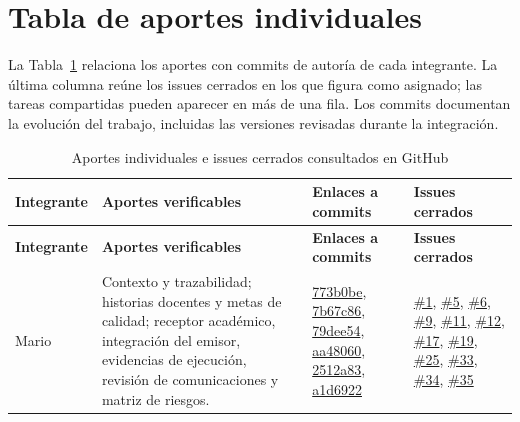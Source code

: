 \section{Tabla de aportes individuales}

La Tabla~\ref{tab:aportes-individuales} relaciona los aportes con commits de autoría de cada integrante. La última columna reúne los issues cerrados en los que figura como asignado; las tareas compartidas pueden aparecer en más de una fila. Los commits documentan la evolución del trabajo, incluidas las versiones revisadas durante la integración.

\begingroup
\small
{}
\begin{longtable}{@{}p{}>{\raggedright\arraybackslash}p{}>{\raggedright\arraybackslash}p{}>{\raggedright\arraybackslash}p{}@{}}
\caption{Aportes individuales e issues cerrados consultados en GitHub}
\label{tab:aportes-individuales}\\
\toprule
\textbf{Integrante} & \textbf{Aportes verificables} & \textbf{Enlaces a commits} & \textbf{Issues cerrados}\\
\midrule
\endfirsthead
\toprule
\textbf{Integrante} & \textbf{Aportes verificables} & \textbf{Enlaces a commits} & \textbf{Issues cerrados}\\
\midrule
\endhead
Mario & Contexto y trazabilidad; historias docentes y metas de calidad; receptor académico, integración del emisor, evidencias de ejecución, revisión de comunicaciones y matriz de riesgos. & \href{https://github.com/Yukisan-uwo/PFC-SGRA/commit/773b0be5be8f30265fbb282b1c5fd1ef332f890a}{773b0be}, \newline \href{https://github.com/Yukisan-uwo/PFC-SGRA/commit/7b67c8678546ac0ca935ab6de85fb188c0a5b31d}{7b67c86}, \newline \href{https://github.com/Yukisan-uwo/PFC-SGRA/commit/79dee54ec2040ab0382c647c796f71730fd93691}{79dee54}, \newline \href{https://github.com/Yukisan-uwo/PFC-SGRA/commit/aa48060927644b957a7771a04588ddfd382b8290}{aa48060}, \newline \href{https://github.com/Yukisan-uwo/PFC-SGRA/commit/2512a83e0fafe7251f1b0d2130168334ce16da25}{2512a83}, \newline \href{https://github.com/Yukisan-uwo/PFC-SGRA/commit/a1d69227db1e8b150eec4c4ce03621892b1f50b7}{a1d6922} & \href{https://github.com/Yukisan-uwo/PFC-SGRA/issues/1}{\#1}, \href{https://github.com/Yukisan-uwo/PFC-SGRA/issues/5}{\#5}, \href{https://github.com/Yukisan-uwo/PFC-SGRA/issues/6}{\#6}, \href{https://github.com/Yukisan-uwo/PFC-SGRA/issues/9}{\#9}, \href{https://github.com/Yukisan-uwo/PFC-SGRA/issues/11}{\#11}, \href{https://github.com/Yukisan-uwo/PFC-SGRA/issues/12}{\#12}, \href{https://github.com/Yukisan-uwo/PFC-SGRA/issues/17}{\#17}, \href{https://github.com/Yukisan-uwo/PFC-SGRA/issues/19}{\#19}, \href{https://github.com/Yukisan-uwo/PFC-SGRA/issues/25}{\#25}, \href{https://github.com/Yukisan-uwo/PFC-SGRA/issues/33}{\#33}, \href{https://github.com/Yukisan-uwo/PFC-SGRA/issues/34}{\#34}, \href{https://github.com/Yukisan-uwo/PFC-SGRA/issues/35}{\#35}\\[0.2cm]

\end{longtable}

